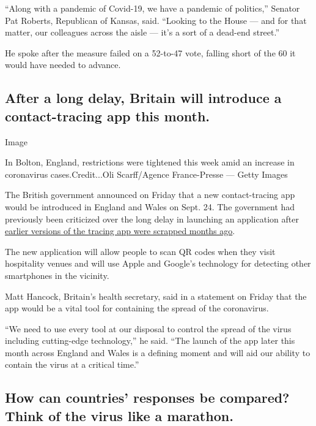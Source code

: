 ``Along with a pandemic of Covid-19, we have a pandemic of politics,''
Senator Pat Roberts, Republican of Kansas, said. ``Looking to the House
--- and for that matter, our colleagues across the aisle --- it's a sort
of a dead-end street.''

He spoke after the measure failed on a 52-to-47 vote, falling short of
the 60 it would have needed to advance.

\hypertarget{after-a-long-delay-britain-will-introduce-a-contact-tracing-app-this-month}{%
\subsection{After a long delay, Britain will introduce a contact-tracing
app this
month.}\label{after-a-long-delay-britain-will-introduce-a-contact-tracing-app-this-month}}

Image

In Bolton, England, restrictions were tightened this week amid an
increase in coronavirus cases.Credit...Oli Scarff/Agence France-Presse
--- Getty Images

The British government announced on Friday that a new contact-tracing
app would be introduced in England and Wales on Sept. 24. The government
had previously been criticized over the long delay in launching an
application after
\href{https://www.nytimes3xbfgragh.onion/2020/06/17/world/europe/uk-contact-tracing-coronavirus.html}{earlier
versions of the tracing app were scrapped months ago}.

The new application will allow people to scan QR codes when they visit
hospitality venues and will use Apple and Google's technology for
detecting other smartphones in the vicinity.

Matt Hancock, Britain's health secretary, said in a statement on Friday
that the app would be a vital tool for containing the spread of the
coronavirus.

``We need to use every tool at our disposal to control the spread of the
virus including cutting-edge technology,'' he said. ``The launch of the
app later this month across England and Wales is a defining moment and
will aid our ability to contain the virus at a critical time.''

\hypertarget{how-can-countries-responses-be-compared-think-of-the-virus-like-a-marathon}{%
\subsection{How can countries' responses be compared? Think of the virus
like a
marathon.}\label{how-can-countries-responses-be-compared-think-of-the-virus-like-a-marathon}}

